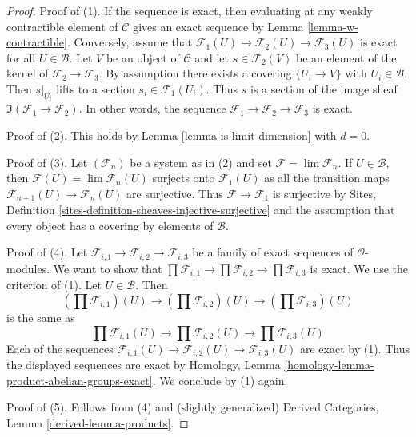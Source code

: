 \begin{proof}
Proof of (1). If the sequence is exact, then evaluating at any
weakly contractible element of $\mathcal{C}$ gives an exact
sequence by Lemma \ref{lemma-w-contractible}. Conversely, assume that
$\mathcal{F}_1(U) \to \mathcal{F}_2(U) \to \mathcal{F}_3(U)$
is exact for all $U \in \mathcal{B}$.
Let $V$ be an object of $\mathcal{C}$ and let
$s \in \mathcal{F}_2(V)$ be an element of the kernel of
$\mathcal{F}_2 \to \mathcal{F}_3$. By assumption there exists
a covering $\{U_i \to V\}$ with $U_i \in \mathcal{B}$.
Then $s|_{U_i}$ lifts to a section $s_i \in \mathcal{F}_1(U_i)$.
Thus $s$ is a section of the image sheaf
$\Im(\mathcal{F}_1 \to \mathcal{F}_2)$.
In other words, the sequence
$\mathcal{F}_1 \to \mathcal{F}_2 \to \mathcal{F}_3$
is exact.

\medskip\noindent
Proof of (2). This holds by Lemma \ref{lemma-is-limit-dimension} with $d = 0$.

\medskip\noindent
Proof of (3). Let $(\mathcal{F}_n)$ be a system as in (2) and set
$\mathcal{F} = \lim \mathcal{F}_n$. If $U \in \mathcal{B}$, then
$\mathcal{F}(U) = \lim \mathcal{F}_n(U)$
surjects onto $\mathcal{F}_1(U)$ as all the transition maps
$\mathcal{F}_{n + 1}(U) \to \mathcal{F}_n(U)$ are surjective.
Thus $\mathcal{F} \to \mathcal{F}_1$ is surjective by
Sites, Definition \ref{sites-definition-sheaves-injective-surjective}
and the assumption that every object
has a covering by elements of $\mathcal{B}$.

\medskip\noindent
Proof of (4). Let
$\mathcal{F}_{i, 1} \to \mathcal{F}_{i, 2} \to \mathcal{F}_{i, 3}$
be a family of exact sequences of $\mathcal{O}$-modules.
We want to show that
$\prod \mathcal{F}_{i, 1} \to \prod \mathcal{F}_{i, 2} \to
\prod \mathcal{F}_{i, 3}$ is exact. We use the criterion of (1).
Let $U \in \mathcal{B}$. Then
$$
(\prod \mathcal{F}_{i, 1})(U) \to
(\prod \mathcal{F}_{i, 2})(U) \to
(\prod \mathcal{F}_{i, 3})(U)
$$
is the same as
$$
\prod \mathcal{F}_{i, 1}(U) \to
\prod \mathcal{F}_{i, 2}(U) \to
\prod \mathcal{F}_{i, 3}(U)
$$
Each of the sequences
$\mathcal{F}_{i, 1}(U) \to \mathcal{F}_{i, 2}(U) \to \mathcal{F}_{i, 3}(U)$
are exact by (1). Thus the displayed sequences are exact by
Homology, Lemma \ref{homology-lemma-product-abelian-groups-exact}.
We conclude by (1) again.

\medskip\noindent
Proof of (5). Follows from (4) and (slightly generalized)
Derived Categories, Lemma \ref{derived-lemma-products}.


\end{proof}
